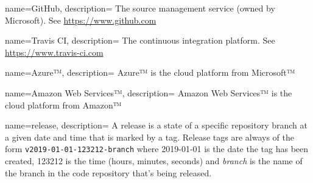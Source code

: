 %
%


{
    name={GitHub},
    description={
        The source management service (owned by Microsoft).
        See \url{https://www.github.com}
    }
}

{
    name={Travis CI},
    description={
        The continuous integration platform.
        See \url{https://www.travis-ci.com}
    }
}


{
    name={Azure™️},
    description={
        Azure™️ is the cloud platform from Microsoft™️
    }
}

{
    name={Amazon Web Services™️},
    description={
        Amazon Web Services™️ is the cloud platform from Amazon™️
    }
}

{
    name={release},
    description={
        A release is a state of a specific repository branch at a given date and time that is marked by a tag.
        Release tags are always of the form \texttt{v2019-01-01-123212-branch} where 2019-01-01 is the date
        the tag has been created, 123212 is the time (hours, minutes, seconds) and \emph{branch} is the name
        of the branch in the code repository that's being released.
    }
}

